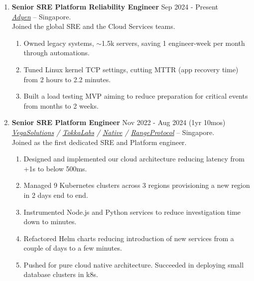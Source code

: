 \documentclass{CVSoftwareEngineer}
\renewcommand{\cvExperience}[5]{{#1 \hfill \scriptsize#4}\\ {\scriptsize {\small\textit{#2}} -- #3.} #5}
\begin{document}
	\begin{enumerate}[labelwidth=!, labelindent=0pt, leftmargin=*, rightmargin=15pt]

		\item[] \cvExperience
			{\textbf{Senior SRE \textbar\space Platform Reliability Engineer}}
			{\href{https://adyen.com}{Adyen}}
			{Singapore}
			{Sep 2024 - Present}
			{
				\\ Joined the global SRE and the Cloud Services teams.
				\begin{enumerate}[labelwidth=!, labelindent=0pt, nosep, leftmargin=*]
					\item[\textasteriskcentered] Owned legacy systems, $\sim$1.5k servers, saving 1 engineer-week per month through automations.
					\item[\textasteriskcentered] Tuned Linux kernel TCP settings, cutting MTTR (app recovery time) from 2 hours to 2.2 minutes.
					\item[\textasteriskcentered] Built a load testing MVP aiming to reduce preparation for critical events from months to 2 weeks.
				\end{enumerate}
			}

		\item[] \cvExperience
			{\textbf{Senior SRE \textbar\space Platform Engineer}}
			{\href{https://vegasolutions.co}{VegaSolutions} / \href{https://tokkalabs.com}{TokkaLabs} / \href{https://native.org/}{Native} / \href{https://www.rangeprotocol.com/}{RangeProtocol}}
			{Singapore}
			{Nov 2022 - Aug 2024 (1yr 10mos)}
			{
				\\ Joined as the first dedicated SRE and Platform engineer.
				\begin{enumerate}[labelwidth=!, labelindent=0pt, nosep, leftmargin=*]
					\item[\textasteriskcentered] Designed and implemented our cloud architecture reducing latency from +1s to below 500ms.
					\item[\textasteriskcentered] Managed 9 Kubernetes clusters across 3 regions provisioning a new region in 2 days end to end.
					\item[\textasteriskcentered] Instrumented Node.js and Python services to reduce investigation time down to minutes.
					\item[\textasteriskcentered] Refactored Helm charts reducing introduction of new services from a couple of days to a few minutes.
					\item[\textasteriskcentered] Pushed for pure cloud native architecture. Succeeded in deploying small database clusters in k8s.
				\end{enumerate}
			}


\end{enumerate}
\end{document}
